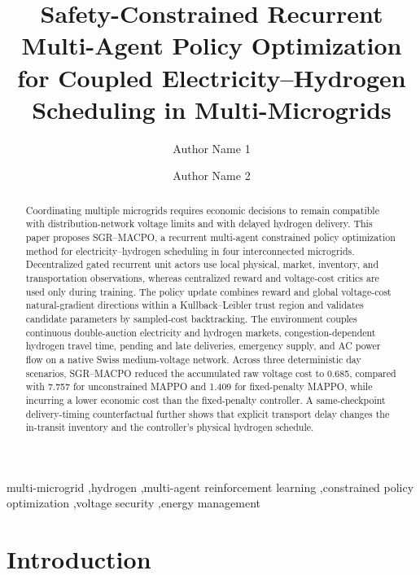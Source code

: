 \documentclass[final,5p,times]{elsarticle}
\newcommand{\method}{SGR--MACPO\xspace}
\begin{document}
\begin{frontmatter}

\title{Safety-Constrained Recurrent Multi-Agent Policy Optimization for Coupled Electricity--Hydrogen Scheduling in Multi-Microgrids}

\author[inst1]{Author Name 1}
\author[inst1]{Author Name 2}
\address[inst1]{Department of Electrical Engineering, Institution Name, City, Country}

\begin{abstract}
Coordinating multiple microgrids requires economic decisions to remain compatible with distribution-network voltage limits and with delayed hydrogen delivery. This paper proposes \method, a recurrent multi-agent constrained policy optimization method for electricity--hydrogen scheduling in four interconnected microgrids. Decentralized gated recurrent unit actors use local physical, market, inventory, and transportation observations, whereas centralized reward and voltage-cost critics are used only during training. The policy update combines reward and global voltage-cost natural-gradient directions within a Kullback--Leibler trust region and validates candidate parameters by sampled-cost backtracking. The environment couples continuous double-auction electricity and hydrogen markets, congestion-dependent hydrogen travel time, pending and late deliveries, emergency supply, and AC power flow on a native Swiss medium-voltage network. Across three deterministic day scenarios, \method reduced the accumulated raw voltage cost to 0.685, compared with 7.757 for unconstrained MAPPO and 1.409 for fixed-penalty MAPPO, while incurring a lower economic cost than the fixed-penalty controller. A same-checkpoint delivery-timing counterfactual further shows that explicit transport delay changes the in-transit inventory and the controller's physical hydrogen schedule.
\end{abstract}

\begin{keyword}
multi-microgrid \sep hydrogen \sep multi-agent reinforcement learning \sep constrained policy optimization \sep voltage security \sep energy management
\end{keyword}

\end{frontmatter}

\section{Introduction}
\label{sec:intro}
\end{document}
